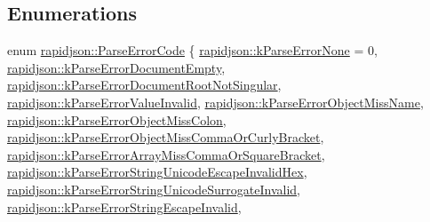 \subsection*{Enumerations}
\begin{DoxyCompactItemize}
\item 
enum \mbox{\hyperlink{group___r_a_p_i_d_j_s_o_n___e_r_r_o_r_s_ga7d3acf640886b1f2552dc8c4cd6dea60}{rapidjson\+::\+Parse\+Error\+Code}} \{ \newline
\mbox{\hyperlink{group___r_a_p_i_d_j_s_o_n___e_r_r_o_r_s_gga7d3acf640886b1f2552dc8c4cd6dea60a86a60b723dca32df5debab2c3db4235f}{rapidjson\+::k\+Parse\+Error\+None}} = 0, 
\mbox{\hyperlink{group___r_a_p_i_d_j_s_o_n___e_r_r_o_r_s_gga7d3acf640886b1f2552dc8c4cd6dea60a06183076357ebd9eca228666f614c286}{rapidjson\+::k\+Parse\+Error\+Document\+Empty}}, 
\mbox{\hyperlink{group___r_a_p_i_d_j_s_o_n___e_r_r_o_r_s_gga7d3acf640886b1f2552dc8c4cd6dea60a2022599bcd4f64d58885a026f95751d5}{rapidjson\+::k\+Parse\+Error\+Document\+Root\+Not\+Singular}}, 
\mbox{\hyperlink{group___r_a_p_i_d_j_s_o_n___e_r_r_o_r_s_gga7d3acf640886b1f2552dc8c4cd6dea60ab7fa69bce0c393cf3a2b6065111f2f57}{rapidjson\+::k\+Parse\+Error\+Value\+Invalid}}, 
\newline
\mbox{\hyperlink{group___r_a_p_i_d_j_s_o_n___e_r_r_o_r_s_gga7d3acf640886b1f2552dc8c4cd6dea60ab707b848425668e765def25554735242}{rapidjson\+::k\+Parse\+Error\+Object\+Miss\+Name}}, 
\mbox{\hyperlink{group___r_a_p_i_d_j_s_o_n___e_r_r_o_r_s_gga7d3acf640886b1f2552dc8c4cd6dea60a58e952084a0dfdbc5630f624252aef5c}{rapidjson\+::k\+Parse\+Error\+Object\+Miss\+Colon}}, 
\mbox{\hyperlink{group___r_a_p_i_d_j_s_o_n___e_r_r_o_r_s_gga7d3acf640886b1f2552dc8c4cd6dea60a2a81a684f39fc882ec99f07e86343f73}{rapidjson\+::k\+Parse\+Error\+Object\+Miss\+Comma\+Or\+Curly\+Bracket}}, 
\mbox{\hyperlink{group___r_a_p_i_d_j_s_o_n___e_r_r_o_r_s_gga7d3acf640886b1f2552dc8c4cd6dea60a1a4ac97731f997e9591b40f98ecd9f93}{rapidjson\+::k\+Parse\+Error\+Array\+Miss\+Comma\+Or\+Square\+Bracket}}, 
\newline
\mbox{\hyperlink{group___r_a_p_i_d_j_s_o_n___e_r_r_o_r_s_gga7d3acf640886b1f2552dc8c4cd6dea60a23c38bf88b8448555c0eb41e1735bd92}{rapidjson\+::k\+Parse\+Error\+String\+Unicode\+Escape\+Invalid\+Hex}}, 
\mbox{\hyperlink{group___r_a_p_i_d_j_s_o_n___e_r_r_o_r_s_gga7d3acf640886b1f2552dc8c4cd6dea60a636209a2e516fbdb4db5ad0a83a6b386}{rapidjson\+::k\+Parse\+Error\+String\+Unicode\+Surrogate\+Invalid}}, 
\mbox{\hyperlink{group___r_a_p_i_d_j_s_o_n___e_r_r_o_r_s_gga7d3acf640886b1f2552dc8c4cd6dea60a8dd0af5e6103a6503c61c38cb2b0bab9}{rapidjson\+::k\+Parse\+Error\+String\+Escape\+Invalid}}, 

\end{DoxyCompactItemize}
